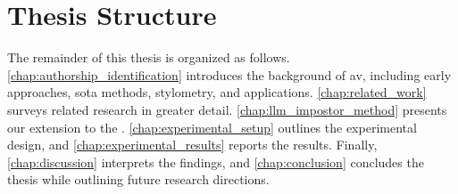 \section{Thesis Structure}
\label{sec:thesis_structure}

The remainder of this thesis is organized as follows. 
\autoref{chap:authorship_identification} introduces the background of \acf{av}, including early approaches, \acl{sota} methods, stylometry, and applications. 
\autoref{chap:related_work} surveys related research in greater detail. 
\autoref{chap:llm_impostor_method} presents our extension to the \impAppr{}. 
\autoref{chap:experimental_setup} outlines the experimental design, and \autoref{chap:experimental_results} reports the results. 
Finally, \autoref{chap:discussion} interprets the findings, and \autoref{chap:conclusion} concludes the thesis while outlining future research directions. 
